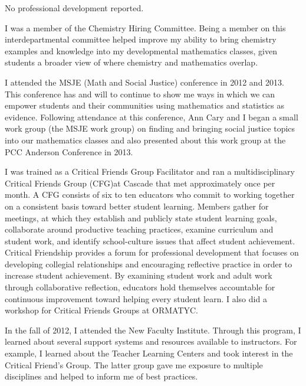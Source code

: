\begin{description}[style=nextline]
	\item[Phil Thurber (Full-time Instructor, Sylvania Campus)]

	No professional development reported.

	\item[Emiliano Vega (Full Time Instructor, Sylvania Camps)]
	I was a member of the Chemistry Hiring Committee. Being a member on this
	interdepartmental committee helped improve my ability to bring chemistry
	examples and knowledge into my developmental mathematics classes, given
	students a broader view of where chemistry and mathematics overlap.

	I attended the MSJE (Math and Social Justice) conference in 2012 and 2013. This
	conference has and will to continue to show me ways in which we can empower
	students and their communities using mathematics and statistics as evidence.
	Following attendance at this conference, Ann Cary and I began a small work
	group (the MSJE work group) on finding and bringing social justice topics into
	our mathematics classes and also presented about this work group at the PCC
	Anderson Conference in 2013.

	\item[Carly Vollet (Full-time Instructor, Cascade Campus)]
	I was trained as a Critical Friends Group Facilitator and ran a
	multidisciplinary Critical Friends Group (CFG)at Cascade that met approximately
	once per month. A CFG consists of six to ten educators who commit to working
	together on a consistent basis toward better student learning. Members gather
	for meetings, at which they establish and publicly state student learning
	goals, collaborate around productive teaching practices, examine curriculum and
	student work, and identify school-culture issues that affect student
	achievement. Critical Friendship provides a forum for professional development
	that focuses on developing collegial relationships and encouraging reflective
	practice in order to increase student achievement.  By examining student work
	and adult work through collaborative reflection, educators hold themselves
	accountable for continuous improvement toward helping every student learn.  I
	also did a workshop for Critical Friends Groups at ORMATYC.

	\item[Jon Wherry (Full-time Instructor, Rock Creek Campus)]
	In the fall of 2012, I attended the New Faculty Institute. Through this
	program, I learned about several support systems and resources available to
	instructors. For example, I learned about the Teacher Learning Centers and took
	interest in the Critical Friend's Group. The latter group gave me exposure to
	multiple disciplines and helped to inform me of best practices.


\end{description}
